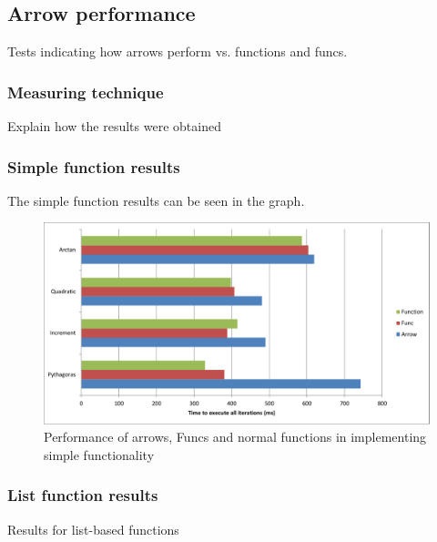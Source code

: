 \documentclass[12pt,twoside,notitlepage]{report}
\begin{document}
\subsection{Arrow performance}

Tests indicating how arrows perform vs. functions and funcs.

\subsubsection{Measuring technique}

Explain how the results were obtained

\subsubsection{Simple function results}

The simple function results can be seen in the graph.

\begin{figure}[!ht]
  \centering
  \includegraphics[width=\textwidth]{fig/SimpleFunctionPerformanceChart.pdf}
  \caption{Performance of arrows, Funcs and normal functions in implementing simple functionality}
  \label{fig:simple_function_performance}
\end{figure}

\subsubsection{List function results}

Results for list-based functions
\end{document}
